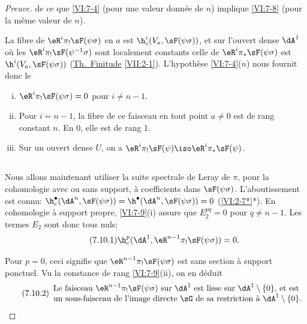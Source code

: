 \begin{proof}[Preuve]
de ce que \ref{VI:7-4} (pour une valeur donnée de $n$) implique \ref{VI:7-8} 
(pour la même valeur de $n$). 

La fibre de $\eR^i \pi_! \sF(\psi\sigma)$ en $a$ est 
$\h_c^i(V_a,\sF(\psi\sigma))$, et sur l'ouvert dense $\dA^1$ où les 
$\eR^i \pi_!\sF(\psi^{-1}\sigma)$ sont localement constants celle de 
$\eR^i \pi_\ast \sF(\psi\sigma)$ est $\h^i(V_a,\sF(\psi\sigma))$ 
(\hyperref[VII]{Th.\ Finitude} \ref{VII:2-1}). L'hypothèse \ref{VI:7-4}($n$) 
nous fournit donc le 





\begin{lemma_}\label{VI:7-9}
\begin{enumerate}[(i)]
  \item $\eR^i \pi_! \sF(\psi\sigma)=0$ pour $i\ne n-1$. 
  \item Pour $i=n-1$, la fibre de ce faisceau en tout point $a\ne 0$ est de rang 
    constant $n$. En $0$, elle est de rang $1$. 
  \item Sur un ouvert dense $U$, on a 
    $\eR^i \pi_! \sF(\psi) \iso \eR^i \pi_\ast \sF(\psi)$. 
\end{enumerate}
\end{lemma_}





\subsection{}\label{VI:7-10}

Nous allons maintenant utiliser la suite spectrale de Leray de $\pi$, pour la 
cohomologie avec ou sans support, à coefficients dans $\sF(\psi\sigma)$. 
L'aboutissement est connu: 
$\h_c^\bullet(\dA^n,\sF(\psi\sigma))=\h^\bullet(\dA^n,\sF(\psi\sigma)) = 0$ 
(\ref{VI:2-7*}*). En cohomologie à support propre, \ref{VI:7-9}(i) assure que 
$E_2^{pq}=0$ pour $q\ne n-1$. Les termes $E_2$ sont donc tous nuls: 
\begin{equation*}\tag{7.10.1}\label{VI:eq:7-10-1}
  \h_c^p(\dA^1,\eR^{n-1} \pi_!\sF(\psi\sigma)) = 0 \text{.} 
\end{equation*}

Pour $p=0$, ceci signifie que $\eR^{n-1}\pi_! \sF(\psi\sigma)$ est sans section 
à support ponctuel. Vu la constance de rang \ref{VI:7-9}(ii), on en déduit 
\begin{equation*}\tag{7.10.2}\label{VI:eq:7-10-2}
  \begin{array}{c}
    \text{Le faisceau $\eR^{n-1} \pi_! \sF(\psi\sigma)$ sur $\dA^1$ est lisse sur $\dA^1\setminus \{0\}$, et est } \\ 
    \text{un sous-faisceau de l'image directe $\sG$ de sa restriction à $\dA^1\setminus \{0\}$.}
  \end{array}
\end{equation*}


\end{proof}

